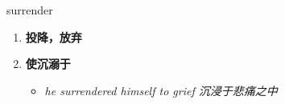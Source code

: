 
\begin{frame}
{\huge surrender}
\begin{center}
\begin{enumerate}\Large
  \item \textbf{投降，放弃}
  \item \textbf{使沉溺于}
  \begin{itemize}
    \item \em{\Large{he surrendered himself to grief 沉浸于悲痛之中}}
  \end{itemize}
\end{enumerate}
\end{center}
\end{frame}
